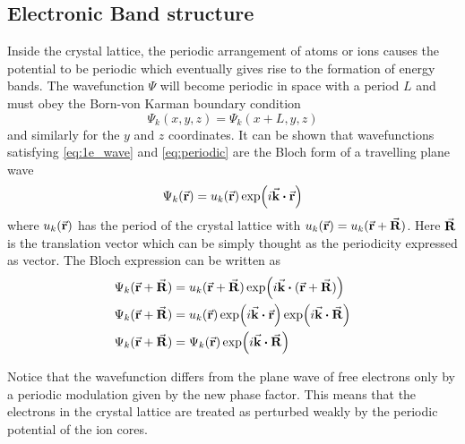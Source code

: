 \subsection{Electronic Band structure}
Inside the crystal lattice, the periodic arrangement of atoms or ions causes the potential to be periodic which eventually gives rise to the formation of energy bands. The wavefunction $\Psi$ will become periodic in space with a period $L$ and must obey the Born-von Karman boundary condition \citep{Herman1959}
\begin{equation} \label{eq:periodic}
	\Psi_k(x,y,z) = \Psi_k(x + L, y, z)
\end{equation}
and similarly for the $y$ and $z$ coordinates. It can be shown that wavefunctions satisfying \eqref{eq:1e_wave} and \eqref{eq:periodic} are the Bloch form of a travelling plane wave
\begin{equation} \label{eq:Bloch}
	\Psi_k(\va{r}) = u_k(\va{r}) \exp(i \va{k} \vdot \va{r})
\end{equation}
where $u_k(\va{r})$ has the period of the crystal lattice with $u_k(\va{r}) = u_k(\va{r} + \va{R})$. Here $\va{R}$ is the translation vector which can be simply thought as the periodicity expressed as vector.  The Bloch expression can be written as
\begin{align}
	\Psi_k(\va{r} + \va{R}) & = u_k(\va{r} + \va{R}) \exp(i \va{k} \vdot (\va{r} + \va{R}))  \notag         \\
	\Psi_k(\va{r} + \va{R}) & = u_k(\va{r}) \exp(i \va{k} \vdot \va{r})  \exp(i \va{k} \vdot \va{R}) \notag \\
	\Psi_k(\va{r} + \va{R}) & = \Psi_k(\va{r}) \exp(i \va{k} \vdot \va{R})
\end{align}

Notice that the wavefunction differs from the plane wave of free electrons only by a periodic modulation given by the new phase factor. This means that the electrons in the crystal lattice are treated as perturbed weakly by the periodic potential of the ion cores.


